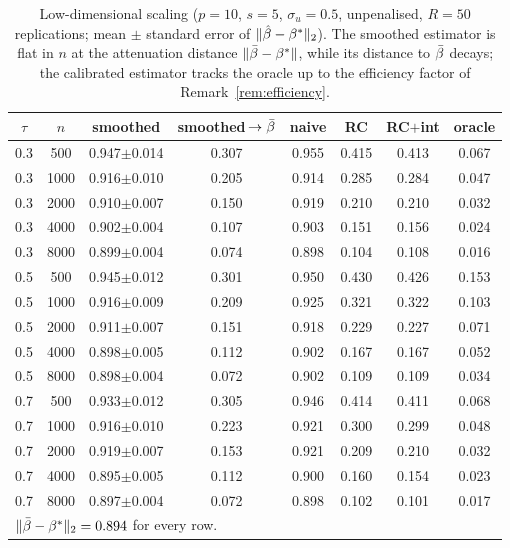 \begin{table}[ht]
\centering
\small
\caption{Low-dimensional scaling ($p=10$, $s=5$, $\sigma_u=0.5$, unpenalised, $R=50$ replications; mean $\pm$ standard error of $\|\hat\beta-\beta^*\|_2$). The smoothed estimator is flat in $n$ at the attenuation distance $\|\bar{\beta}-\beta^*\|$, while its distance to $\bar{\beta}$ decays; the calibrated estimator tracks the oracle up to the efficiency factor of Remark~\ref{rem:efficiency}.}
\label{tab:scaling}
\begin{tabular}{cccccccc}
\toprule
$\tau$ & $n$ & smoothed & smoothed$\,\to\bar{\beta}$ & naive & RC & RC$+$int & oracle \\
\midrule
0.3 & 500 & 0.947$\pm$0.014 & 0.307 & 0.955 & 0.415 & 0.413 & 0.067 \\
0.3 & 1000 & 0.916$\pm$0.010 & 0.205 & 0.914 & 0.285 & 0.284 & 0.047 \\
0.3 & 2000 & 0.910$\pm$0.007 & 0.150 & 0.919 & 0.210 & 0.210 & 0.032 \\
0.3 & 4000 & 0.902$\pm$0.004 & 0.107 & 0.903 & 0.151 & 0.156 & 0.024 \\
0.3 & 8000 & 0.899$\pm$0.004 & 0.074 & 0.898 & 0.104 & 0.108 & 0.016 \\
0.5 & 500 & 0.945$\pm$0.012 & 0.301 & 0.950 & 0.430 & 0.426 & 0.153 \\
0.5 & 1000 & 0.916$\pm$0.009 & 0.209 & 0.925 & 0.321 & 0.322 & 0.103 \\
0.5 & 2000 & 0.911$\pm$0.007 & 0.151 & 0.918 & 0.229 & 0.227 & 0.071 \\
0.5 & 4000 & 0.898$\pm$0.005 & 0.112 & 0.902 & 0.167 & 0.167 & 0.052 \\
0.5 & 8000 & 0.898$\pm$0.004 & 0.072 & 0.902 & 0.109 & 0.109 & 0.034 \\
0.7 & 500 & 0.933$\pm$0.012 & 0.305 & 0.946 & 0.414 & 0.411 & 0.068 \\
0.7 & 1000 & 0.916$\pm$0.010 & 0.223 & 0.921 & 0.300 & 0.299 & 0.048 \\
0.7 & 2000 & 0.919$\pm$0.007 & 0.153 & 0.921 & 0.209 & 0.210 & 0.032 \\
0.7 & 4000 & 0.895$\pm$0.005 & 0.112 & 0.900 & 0.160 & 0.154 & 0.023 \\
0.7 & 8000 & 0.897$\pm$0.004 & 0.072 & 0.898 & 0.102 & 0.101 & 0.017 \\
\midrule
\multicolumn{8}{l}{$\|\bar{\beta}-\beta^*\|_2 = 0.894$ for every row.}\\
\bottomrule
\end{tabular}
\end{table}
